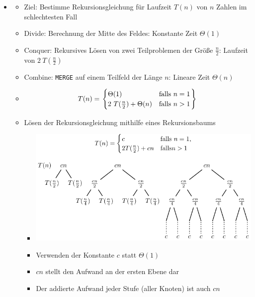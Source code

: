 \documentclass[
    ngerman,
    color=3b,
    load_common, %
    summary,
    boxarc,
]{tuda_summary}
\begin{document}
\begin{itemize}
    \item {}
          \begin{itemize}
              \item Ziel: Bestimme Rekursionsgleichung für Laufzeit $T(n)$ von $n$ Zahlen im schlechtesten Fall
              \item Divide: Berechnung der Mitte des Feldes: Konstante Zeit $\Theta(1)$
              \item Conquer: Rekursives Lösen von zwei Teilproblemen der Größe $\frac{n}{2}$: Laufzeit von $2~T(\frac{n}{2})$
              \item Combine: \texttt{MERGE} auf einem Teilfeld der Länge $n$: Lineare Zeit $\Theta(n)$
              \item[] \[
                        T(n) = \left.
                        \begin{cases}
                            \hiderowcolors
                            \Theta(1)                    & \text{falls } n = 1 \\
                            2~T(\frac{n}{2}) + \Theta(n) & \text{falls } n > 1 \\
                        \end{cases}
                        \right \}
                    \]
              \item Lösen der Rekursionsgleichung mithilfe eines Rekursionsbaums
                    \begin{itemize}
                        \item[] \includegraphics[width=14cm]{pictures/merge_sort_equation/merge_sort_equation}
                        \item Verwenden der Konstante $c$ statt $\Theta(1)$
                        \item $cn$ stellt den Aufwand an der ersten Ebene dar
                        \item Der addierte Aufwand jeder Stufe (aller Knoten) ist auch $cn$

\end{itemize}
\end{itemize}
\end{itemize}
\end{document}
